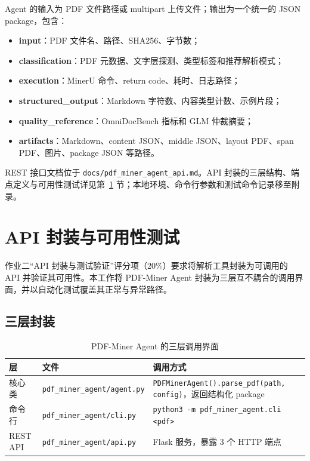 \documentclass[UTF8,a4paper,11pt]{ctexart}
\begin{document}
Agent 的输入为 PDF 文件路径或 multipart 上传文件；输出为一个统一的 JSON package，包含：
\begin{itemize}
  \item \textbf{input}：PDF 文件名、路径、SHA256、字节数；
  \item \textbf{classification}：PDF 元数据、文字层探测、类型标签和推荐解析模式；
  \item \textbf{execution}：MinerU 命令、return code、耗时、日志路径；
  \item \textbf{structured\_output}：Markdown 字符数、内容类型计数、示例片段；
  \item \textbf{quality\_reference}：OmniDocBench 指标和 GLM 仲裁摘要；
  \item \textbf{artifacts}：Markdown、content JSON、middle JSON、layout PDF、span PDF、图片、package JSON 等路径。
\end{itemize}

REST 接口文档位于 \texttt{docs/pdf\_miner\_agent\_api.md}。API 封装的三层结构、端点定义与可用性测试详见第~\ref{sec:apitest} 节；本地环境、命令行参数和测试命令记录移至附录。

\section{API 封装与可用性测试}
\label{sec:apitest}

作业二``API 封装与测试验证''评分项（20\%）要求将解析工具封装为可调用的 API 并验证其可用性。本工作将 PDF-Miner Agent 封装为三层互不耦合的调用界面，并以自动化测试覆盖其正常与异常路径。

\subsection{三层封装}

\begin{table}[H]
\centering
\caption{PDF-Miner Agent 的三层调用界面}
\label{tab:apilayers}
\begin{tabular}{p{2.2cm}p{4.6cm}p{6.2cm}}
\toprule
层 & 文件 & 调用方式 \\
\midrule
核心类 & \texttt{pdf\_miner\_agent/agent.py} & \texttt{PDFMinerAgent().parse\_pdf(path, config)}，返回结构化 package \\
命令行 & \texttt{pdf\_miner\_agent/cli.py} & \texttt{python3 -m pdf\_miner\_agent.cli <pdf>} \\
REST API & \texttt{pdf\_miner\_agent/api.py} & Flask 服务，暴露 3 个 HTTP 端点 \\
\bottomrule
\end{tabular}
\end{table}
\end{document}

